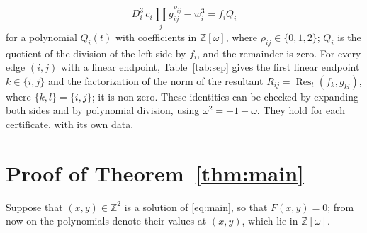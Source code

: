 \documentclass[11pt]{article}
\newcommand{\Z}{\mathbb{Z}}
\begin{document}
\begin{equation}\label{eq:starlin}
D_i^3\,c_i\prod_jg_{ij}^{\rho_{ij}}-w_i^3=f_iQ_i
\end{equation}
for a polynomial $Q_i(t)$ with coefficients in $\Z[\omega]$, where $\rho_{ij}\in\{0,1,2\}$; $Q_i$ is the quotient of the division of the left side by $f_i$, and the remainder is zero.
For every edge $(i,j)$ with a linear endpoint, Table~\ref{tab:sep} gives the first linear endpoint $k\in\{i,j\}$ and the factorization of the norm of the resultant $R_{ij}=\operatorname{Res}_t(f_k,g_{kl})$, where $\{k,l\}=\{i,j\}$; it is non-zero.
These identities can be checked by expanding both sides and by polynomial division, using $\omega^2=-1-\omega$. They hold for each certificate, with its own data.

\section{Proof of Theorem~\ref{thm:main}}

Suppose that $(x,y)\in\Z^2$ is a solution of \eqref{eq:main}, so that $F(x,y)=0$; from now on the polynomials denote their values at $(x,y)$, which lie in $\Z[\omega]$.
\end{document}
